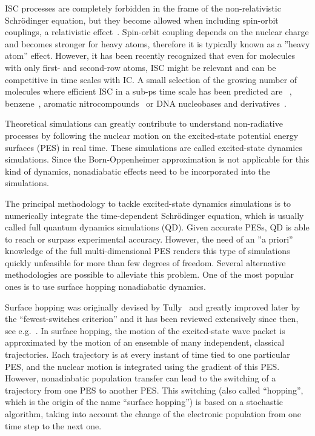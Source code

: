 \documentclass[a4paper,10pt,DIV=15,openany,twoside=false]{scrbook}
\begin{document}
ISC processes are completely forbidden in the frame of the non-relativistic Schr\"odinger equation, but they become allowed when including spin-orbit couplings, a relativistic effect~\cite{Marian2012WCMS}. Spin-orbit coupling depends on the nuclear charge and becomes stronger for heavy atoms, therefore it is typically known as a ''heavy atom'' effect. However, it has been recently recognized that even for molecules with only first- and second-row atoms, ISC might be relevant and can be competitive in time scales with IC. A small selection of the growing number of molecules where efficient ISC in a sub-ps time scale has been predicted are ~\cite{Wilkinson2014JCP,Mai2014JCP_SO2,Leveque2014JCP_ISC}, benzene~\cite{Penfold2012JCP}, aromatic nitrocompounds~\cite{Vogt2013JPC} or DNA nucleobases and derivatives~\cite{Crespo-Hernandez2004CR, Richter2012JPCL, Martinez-Fernandez2012CC, Mai2013C, Reichardt2010CC}.

Theoretical simulations can greatly contribute to understand non-radiative processes by following the nuclear motion on the excited-state potential energy surfaces (PES) in real time. These simulations are called excited-state dynamics simulations. 
Since the Born-Oppenheimer approximation is not applicable for this kind of dynamics, nonadiabatic effects need to be incorporated into the simulations.

The principal methodology to tackle excited-state dynamics simulations is to numerically integrate the time-dependent Schr\"odinger equation, which is usually called full quantum dynamics simulations (QD). Given accurate PESs, QD is able to reach or surpass experimental accuracy. However, the need of an ''a priori'' knowledge of the full multi-dimensional PES renders this type of simulations quickly unfeasible for more than few degrees of freedom. Several alternative methodologies are possible to alleviate this problem. One of the most popular ones is to use surface hopping nonadiabatic dynamics.

Surface hopping was originally devised by Tully~\cite{Tully1971JCP} and greatly improved later by the ``fewest-switches criterion''\cite{Tully1990JCP} and it has been reviewed extensively since then, see e.g.~\cite{Barbatti2011WCMS,Doltsinis2006,Doltsinis2002JTCC}.
In surface hopping, the motion of the excited-state wave packet is approximated by the motion of an ensemble of many independent, classical trajectories. Each trajectory is at every instant of time tied to one particular PES, and the nuclear motion is integrated using the gradient of this PES. However, nonadiabatic population transfer can lead to the switching of a trajectory from one PES to another PES. This switching (also called ``hopping'', which is the origin of the name ``surface hopping'') is based on a stochastic algorithm, taking into account the change of the electronic population from one time step to the next one.
\end{document}
